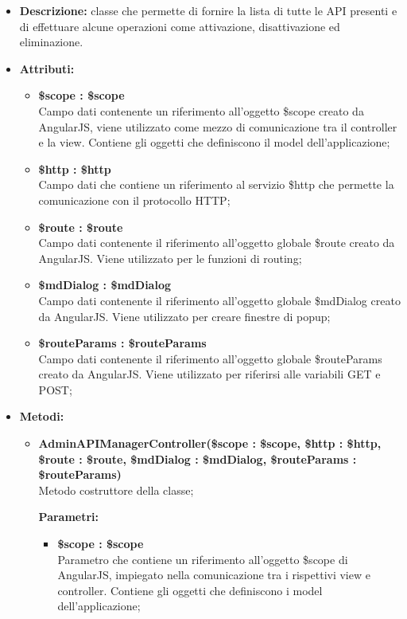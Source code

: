 \begin{itemize}
	\item \textbf{Descrizione:} classe che permette di fornire la lista di tutte le API presenti e di effettuare alcune operazioni come attivazione, disattivazione ed eliminazione.
	\item \textbf{Attributi:}
	\begin{itemize}
		
		\item \textbf{\$scope : \$scope}\\
		Campo dati contenente un riferimento all'oggetto \$scope creato da AngularJS, viene utilizzato come mezzo di comunicazione tra il controller e la view. Contiene gli oggetti che definiscono il model dell'applicazione;
		
		\item \textbf{\$http : \$http }\\
		Campo dati che contiene un riferimento al servizio \$http che permette la comunicazione con il protocollo HTTP;
		
		\item \textbf{\$route : \$route }\\
		Campo dati contenente il riferimento all'oggetto globale \$route creato da AngularJS. Viene utilizzato per le funzioni di routing;
		
		\item \textbf{\$mdDialog : \$mdDialog }\\
		Campo dati contenente il riferimento all'oggetto globale \$mdDialog creato da AngularJS. Viene utilizzato per creare finestre di popup;
		
		\item \textbf{\$routeParams : \$routeParams }\\
		Campo dati contenente il riferimento all'oggetto globale \$routeParams creato da AngularJS. Viene utilizzato per riferirsi alle variabili GET e POST;
		
		
	\end{itemize}
	\item \textbf{Metodi:}
	\begin{itemize}
		
		\item \textbf{AdminAPIManagerController(\$scope : \$scope, \$http : \$http, \$route : \$route, \$mdDialog : \$mdDialog, \$routeParams : \$routeParams)}\\
		Metodo costruttore della classe;
		\begin{description}
			\item[\textbf{Parametri:}]
		\end{description}
		\begin{itemize}
			\item \textbf{\$scope : \$scope}\\
			Parametro che contiene un riferimento all'oggetto \$scope di AngularJS, impiegato nella comunicazione tra i rispettivi view e controller. Contiene gli oggetti che definiscono i model dell'applicazione;
			

\end{itemize}
\end{itemize}
\end{itemize}
